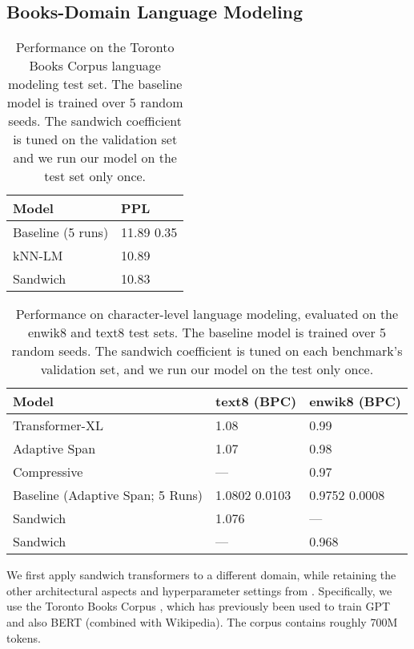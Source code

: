 \documentclass[11pt,a4paper]{article}
\begin{document}
\subsection{Books-Domain Language Modeling}
\label{sec.books}

\begin{table}[t]
\centering
\small
\begin{tabular}{@{}ll@{}}
\toprule
\textbf{Model} & \textbf{PPL}  \\
\midrule
Baseline (5 runs) & 11.89  0.35 \\
kNN-LM \cite{urvashi} & 10.89 \\ 
Sandwich & 10.83 \\
\bottomrule
\end{tabular}
\caption{Performance on the Toronto Books Corpus language modeling test set. The baseline model \cite{baevski2018adaptive} is trained over 5 random seeds. The sandwich coefficient is tuned on the validation set and we run our model on the test set only once.}
\label{tab.bookstest}
\end{table}


\begin{table*}[t]
\centering
\small
\begin{tabular}{@{}lll@{}}
\toprule
\textbf{Model} & \textbf{text8 (BPC)} & \textbf{enwik8 (BPC)}  \\
\midrule
Transformer-XL \cite{transformerXL} & 1.08 & 0.99 \\ 
Adaptive Span \cite{Sukhbaatar2019} & 1.07 & 0.98 \\
Compressive \cite{compressive} & --- & 0.97 \\
\midrule
Baseline (Adaptive Span; 5 Runs) & 1.0802  0.0103 & 0.9752  0.0008 \\
Sandwich & 1.076 & --- \\
Sandwich & --- & 0.968 \\
\bottomrule
\end{tabular}
\caption{Performance on character-level language modeling, evaluated on the enwik8 and text8 test sets. The baseline model \cite{Sukhbaatar2019} is trained over 5 random seeds. The sandwich coefficient is tuned on each benchmark's validation set, and we run our model on the test only once.}
\label{tab.charlm}
\end{table*}

We first apply sandwich transformers to a different domain, while retaining the other architectural aspects and hyperparameter settings from \citet{baevski2018adaptive}.
Specifically, we use the Toronto Books Corpus  \cite{moviebook}, which has previously been used to train GPT \cite{gpt-1} and  also  BERT \cite{BERT} (combined with Wikipedia). The corpus contains roughly 700M tokens.
\end{document}
